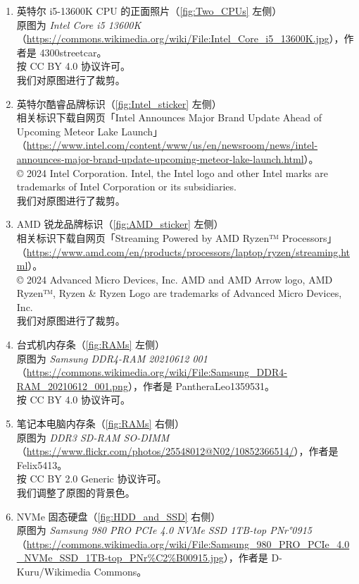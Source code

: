 \begin{enumerate}
  \item 英特尔 i5-13600K CPU 的正面照片（\autoref{fig:Two_CPUs} 左侧）\\
    原图为 \textit{Intel Core i5 13600K}（\url{https://commons.wikimedia.org/wiki/File:Intel_Core_i5_13600K.jpg}），作者是 4300streetcar。\\
    按 CC BY 4.0 协议许可。\\
    我们对原图进行了裁剪。
  \item 英特尔酷睿品牌标识（\autoref{fig:Intel_sticker} 左侧）\\
    相关标识下载自网页「Intel Announces Major Brand Update Ahead of Upcoming Meteor Lake Launch」（\url{https://www.intel.com/content/www/us/en/newsroom/news/intel-announces-major-brand-update-upcoming-meteor-lake-launch.html}）。\\
    © 2024 Intel Corporation. Intel, the Intel logo and other Intel marks are trademarks of Intel Corporation or its subsidiaries.\\
    我们对原图进行了裁剪。
  \item AMD 锐龙品牌标识（\autoref{fig:AMD_sticker} 左侧）\\
    相关标识下载自网页「Streaming Powered by AMD Ryzen™ Processors」（\url{https://www.amd.com/en/products/processors/laptop/ryzen/streaming.html}）。\\
    © 2024 Advanced Micro Devices, Inc. AMD and AMD Arrow logo, AMD Ryzen™, Ryzen \& Ryzen Logo are trademarks of Advanced Micro Devices, Inc.\\
    我们对原图进行了裁剪。 
  \item 台式机内存条（\autoref{fig:RAMs} 左侧）\\
    原图为 \textit{Samsung DDR4-RAM 20210612 001}（\url{https://commons.wikimedia.org/wiki/File:Samsung_DDR4-RAM_20210612_001.png}），作者是 PantheraLeo1359531。\\
    按 CC BY 4.0 协议许可。
  \item 笔记本电脑内存条（\autoref{fig:RAMs} 右侧）\\
    原图为 \textit{DDR3 SD-RAM SO-DIMM}（\url{https://www.flickr.com/photos/25548012@N02/10852366514/}），作者是 Felix5413。\\
    按 CC BY 2.0 Generic 协议许可。\\
    我们调整了原图的背景色。
  \item NVMe 固态硬盘（\autoref{fig:HDD_and_SSD} 右侧）\\
    原图为 \textit{Samsung 980 PRO PCIe 4.0 NVMe SSD 1TB-top PNr°0915}（\url{https://commons.wikimedia.org/wiki/File:Samsung_980_PRO_PCIe_4.0_NVMe_SSD_1TB-top_PNr%C2%B00915.jpg}），作者是 D-Kuru/Wikimedia Commons。\\

\end{enumerate}
